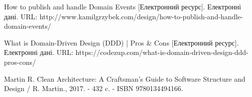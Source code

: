 \begin{thebibliography}{00}
			How to publish and handle Domain Events
      [Електронний ресурс]. Електронні дані.
			URL: http://www.kamilgrzybek.com/design/how-to-publish-and-handle-domain-events/
	
			What is Domain-Driven Design (DDD) | Pros \& Cons
      [Електронний ресурс]. Електронні дані.
			URL: https://codezup.com/what-is-domain-driven-design-ddd-pros-cons/
	
			Martin R.
			Clean Architecture: A Craftsman's Guide to Software Structure and Design /
			R. Martin., 2017. - 432 c. - ISBN 9780134494166.

\end{thebibliography}
\endgroup

\clearpage
